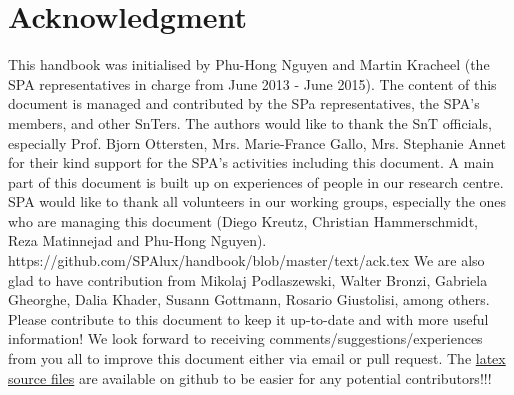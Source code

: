 \section*{Acknowledgment}
This handbook was initialised by Phu-Hong Nguyen and Martin Kracheel (the SPA representatives in charge from June 2013 - June 2015). The content of this document is managed and contributed by the SPa representatives, the SPA's members, and other SnTers. The authors would like to thank the SnT officials, especially Prof. Bjorn Ottersten, Mrs. Marie-France Gallo, Mrs. Stephanie Annet for their kind support for the SPA's activities including this document. 
A main part of this document is built up on experiences of people in our research centre. 
SPA would like to thank all volunteers in our working groups, especially the ones who are managing this document (Diego Kreutz, Christian Hammerschmidt, Reza Matinnejad and Phu-Hong Nguyen). https://github.com/SPAlux/handbook/blob/master/text/ack.tex
We are also glad to have contribution from Mikolaj Podlaszewski, Walter Bronzi, Gabriela Gheorghe, Dalia Khader, Susann Gottmann, Rosario Giustolisi, among others. 
Please contribute to this document to keep it up-to-date and with more useful information! 
We look forward to receiving comments/suggestions/experiences from you all to improve this document either via email or pull request. 
The \href{https://github.com/SPAlux/handbook}{latex source files} are available on github to be easier for any potential contributors!!!
